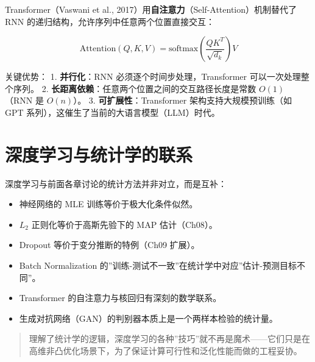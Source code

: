 \documentclass[
]{book}
\providecommand{\tightlist}{%
  \setlength{\itemsep}{0pt}\setlength{\parskip}{0pt}}
\begin{document}
Transformer（Vaswani et al., 2017）用\textbf{自注意力}（Self-Attention）机制替代了 RNN 的递归结构，允许序列中任意两个位置直接交互：

\[\text{Attention}(Q, K, V) = \text{softmax}\left(\frac{QK^T}{\sqrt{d_k}}\right) V\]

关键优势：
1. \textbf{并行化}：RNN 必须逐个时间步处理，Transformer 可以一次处理整个序列。
2. \textbf{长距离依赖}：任意两个位置之间的交互路径长度是常数 \(O(1)\)（RNN 是 \(O(n)\)）。
3. \textbf{可扩展性}：Transformer 架构支持大规模预训练（如 GPT 系列），这催生了当前的大语言模型（LLM）时代。

\section{深度学习与统计学的联系}\label{ux6df1ux5ea6ux5b66ux4e60ux4e0eux7edfux8ba1ux5b66ux7684ux8054ux7cfb}

深度学习与前面各章讨论的统计方法并非对立，而是互补：

\begin{itemize}
\tightlist
\item
  神经网络的 MLE 训练等价于极大化条件似然。
\item
  \(L_2\) 正则化等价于高斯先验下的 MAP 估计（Ch08）。
\item
  Dropout 等价于变分推断的特例（Ch09 扩展）。
\item
  Batch Normalization 的''训练-测试不一致''在统计学中对应''估计-预测目标不同''。
\item
  Transformer 的自注意力与核回归有深刻的数学联系。
\item
  生成对抗网络（GAN）的判别器本质上是一个两样本检验的统计量。
\end{itemize}

\begin{quote}
理解了统计学的逻辑，深度学习的各种''技巧''就不再是魔术------它们只是在高维非凸优化场景下，为了保证计算可行性和泛化性能而做的工程妥协。
\end{quote}
\end{document}
